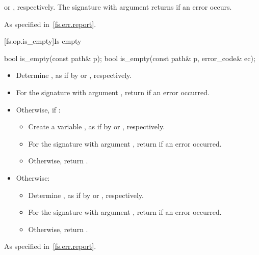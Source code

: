 \begin{itemdescr}
\pnum
\returns {} or ,
  respectively. The signature with argument
   returns  if an error occurs.

\pnum
\throws As specified in~\ref{fs.err.report}.
\end{itemdescr}


[fs.op.is_empty]{Is empty}

%
\begin{itemdecl}
bool is_empty(const path& p);
bool is_empty(const path& p, error_code& ec);
\end{itemdecl}

\begin{itemdescr}
\pnum
\effects
\begin{itemize}
\item Determine ,
   as if by  or , respectively.
\item For the signature with argument ,
   return  if an error occurred.
\item Otherwise, if :
  \begin{itemize}
  \item Create a variable ,
     as if by  or
     , respectively.
  \item For the signature with argument ,
     return  if an error occurred.
  \item Otherwise, return .
  \end{itemize}
\item
Otherwise:
  \begin{itemize}
  \item Determine ,
    as if by  or , respectively.
  \item For the signature with argument ,
    return  if an error occurred.
  \item Otherwise, return .
  \end{itemize}
\end{itemize}

\pnum
\throws As specified in~\ref{fs.err.report}.
\end{itemdescr}


